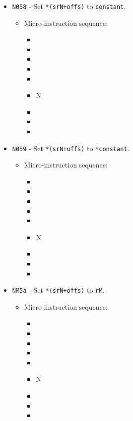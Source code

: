 \documentclass{article}
\begin{document}
\begin{itemize}
    
    \item \Verb|N058| - Set \Verb|*(srN+offs)| to \Verb|constant|.
    \begin{itemize}
        \item Micro-instruction sequence:
        \begin{itemize}
            \item \pkptroutinc
            \item \datatooffs
            \item \incrementpk
            \item \pkptroutinc
            \item \holddata
            \item \specialtoaddr N
            \item \writeRAMo
            \item \incrementpk
            \item \done
        \end{itemize}
    \end{itemize}
    
    \item \Verb|N059| - Set \Verb|*(srN+offs)| to \Verb|*constant|.
    \begin{itemize}
        \item Micro-instruction sequence:
        \begin{itemize}
            \item \pkptroutinc
            \item \datatooffs
            \item \incrementpk
            \item \pkptroutinc
            \item \holddata
            \item \specialtoaddr N
            \item \writeRAMo
            \item \incrementpk
            \item \done
        \end{itemize}
    \end{itemize}
    
    \item \Verb|NM5a| - Set \Verb|*(srN+offs)| to \Verb|rM|.
    \begin{itemize}
        \item Micro-instruction sequence:
        \begin{itemize}
            \item \pkptroutinc
            \item \datatooffs
            \item \incrementpk
            \item \pkptroutinc
            \item \holddata
            \item \specialtoaddr N
            \item \writeRAMo
            \item \incrementpk
            \item \done
        \end{itemize}
    \end{itemize}
    

\end{itemize}
\end{document}
